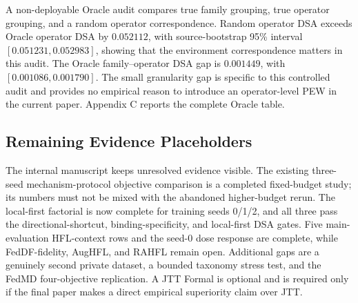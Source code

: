 A non-deployable Oracle audit compares true family grouping, true operator grouping, and a random operator correspondence. Random operator DSA exceeds Oracle operator DSA by \(0.052112\), with source-bootstrap 95\% interval \([0.051231,0.052983]\), showing that the environment correspondence matters in this audit. The Oracle family--operator DSA gap is \(0.001449\), with \([0.001086,0.001790]\). The small granularity gap is specific to this controlled audit and provides no empirical reason to introduce an operator-level PEW in the current paper. Appendix C reports the complete Oracle table.

\subsection{Remaining Evidence Placeholders}

The internal manuscript keeps unresolved evidence visible. The existing three-seed mechanism-protocol objective comparison is a completed fixed-budget study; its numbers must not be mixed with the abandoned higher-budget rerun. The local-first factorial is now complete for training seeds 0/1/2, and all three pass the directional-shortcut, binding-specificity, and local-first DSA gates. Five main-evaluation HFL-context rows and the seed-0 dose response are complete, while FedDF-fidelity, AugHFL, and RAHFL remain open. Additional gaps are a genuinely second private dataset, a bounded taxonomy stress test, and the FedMD four-objective replication. A JTT Formal is optional and is required only if the final paper makes a direct empirical superiority claim over JTT.

